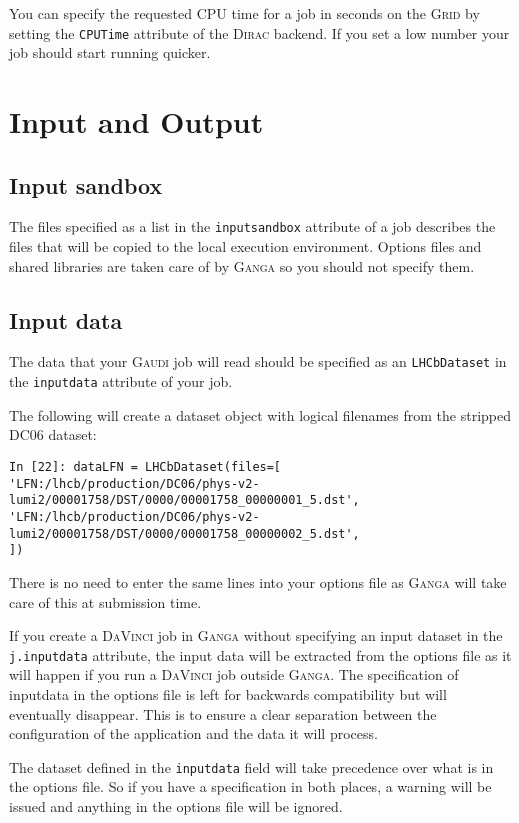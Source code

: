 \documentclass{howto}
\def\ganga {\textsc{Ganga}\xspace}
\def\gaudi {\textsc{Gaudi}\xspace}
\def\davinci {\textsc{DaVinci}\xspace}
\def\dirac {\textsc{Dirac}\xspace}
\def\grid {\textsc{Grid}\xspace}
\begin{document}
You can specify the requested CPU time for a job in seconds on the \grid by
setting the \texttt{CPUTime} attribute of the \dirac backend. If you set a low
number your job should start running quicker.

\section{Input and Output}
\label{sec:InOut}

\subsection{Input sandbox}
\label{sec:Inputsandbox}
The files specified as a list in the \texttt{inputsandbox} attribute of a job
describes the files that will be copied to the local execution environment.
Options files and shared libraries are taken care of by \ganga so you should
not specify them.

\subsection{Input data}
\label{sec:datasets}
The data that your \gaudi job will read should be specified as an
\texttt{LHCbDataset} in the \texttt{inputdata} attribute of your job.

The following will create a dataset object with logical filenames from the
stripped DC06 dataset:
\begin{verbatim}
In [22]: dataLFN = LHCbDataset(files=[
'LFN:/lhcb/production/DC06/phys-v2-lumi2/00001758/DST/0000/00001758_00000001_5.dst',
'LFN:/lhcb/production/DC06/phys-v2-lumi2/00001758/DST/0000/00001758_00000002_5.dst',
])
\end{verbatim}
There is no need to enter the same lines into your options file as \ganga will
take care of this at submission time.

If you create a \davinci job in \ganga without specifying an input dataset in
the \texttt{j.inputdata} attribute, the input data will be extracted from the
options file as it will happen if you run a \davinci job outside \ganga. The
specification of inputdata in the options file is left for backwards
compatibility but will eventually disappear. This is to ensure a clear
separation between the configuration of the application and the data it will
process.

\begin{notice}
  The dataset defined in the \texttt{inputdata} field will take precedence
  over what is in the options file. So if you have a specification in both
  places, a warning will be issued and anything in the options file will be
  ignored.
\end{notice}
\end{document}

